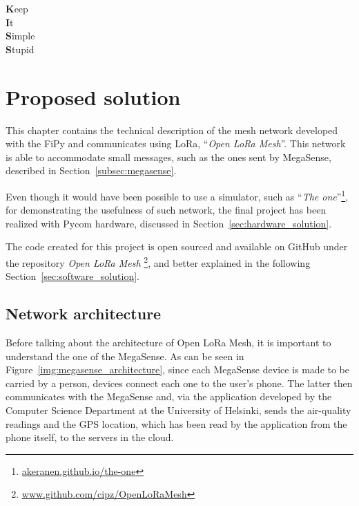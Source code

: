 
\begin{savequote}[40mm]
	\textbf{K}eep\\
	\textbf{I}t\\
	\textbf{S}imple\\
	\textbf{S}tupid
\end{savequote}

\chapter{Proposed solution}\label{chapter:proposed_solution}


	This chapter contains the technical description of the mesh network developed with the FiPy and communicates using LoRa, ``\textit{Open LoRa Mesh}''.
	This network is able to accommodate small messages, such as the ones sent by MegaSense, described in Section~\ref{subsec:megasense}.

	Even though it would have been possible to use a simulator, such as ``\textit{The one}''\footnote{ \url{akeranen.github.io/the-one}}, for demonstrating the usefulness of such network, the final project has been realized with Pycom hardware, discussed in Section~\ref{sec:hardware_solution}.
	
	The code created for this project is open sourced and available on GitHub under the repository \textit{Open LoRa Mesh} \footnote{ \url{www.github.com/cipz/OpenLoRaMesh}}, and better explained in the following Section~\ref{sec:software_solution}.
	
	\section{Network architecture}\label{sec:architecture}
		
		Before talking about the architecture of Open LoRa Mesh, it is important to understand the one of the MegaSense.
		As can be seen in Figure~\ref{img:megasense_architecture}, since each MegaSense device is made to be carried by a person, devices connect each one to the user's phone.
		The latter then communicates with the MegaSense and, via the application developed by the Computer Science Department at the University of Helsinki, sends the air-quality readings and the GPS location, which has been read by the application from the phone itself, to the servers in the cloud.
		

